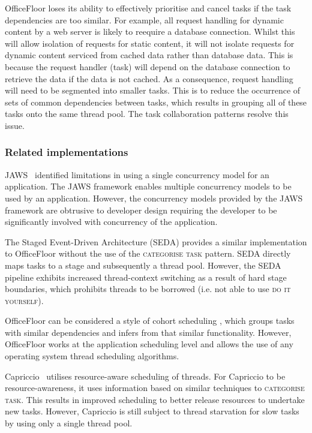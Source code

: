 \documentclass[prodmode]{style/acmlarge}
\begin{document}
OfficeFloor loses its ability to effectively prioritise and cancel tasks if the
task dependencies are too similar.  For example, all request handling for
dynamic content by a web server is likely to reequire a database connection.
Whilst this will allow isolation of requests for static content, it will not
isolate requests for dynamic content serviced from cached data rather than
database data.  This is because the request handler (task) will depend on the
database connection to retrieve the data if the data is not cached.  As a
consequence, request handling will need to be segmented into smaller tasks. 
This is to reduce the occurrence of sets of common dependencies between tasks,
which results in grouping all of these tasks onto the same thread pool.  The task
collaboration patterns resolve this issue.


\subsubsection*{Related implementations}

JAWS~\cite{jaws} identified limitations in using a single concurrency model for
an application.  The JAWS framework enables multiple concurrency models to be
used by an application.  However, the concurrency models provided by the JAWS
framework are obtrusive to developer design requiring the developer to be
significantly involved with concurrency of the application.

The Staged Event-Driven Architecture (SEDA) \cite{seda} provides a similar
implementation to OfficeFloor without the use of the \textsc{categorise task}
pattern.  SEDA directly maps tasks to a stage and subsequently a thread pool.
However, the SEDA pipeline exhibits increased thread-context switching as a
result of hard stage boundaries, which prohibits threads to be borrowed (i.e.
not able to use \textsc{do it yourself}).

OfficeFloor can be considered a style of cohort scheduling \cite{cohort}, which
groups tasks with similar dependencies and infers from that similar
functionality.  However, OfficeFloor works at the application scheduling level
and allows the use of any operating system thread scheduling algorithms.

Capriccio~\cite{capriccio} utilises resource-aware scheduling of threads.  For
Capriccio to be resource-awareness, it uses information based on similar
techniques to \textsc{categorise task}.  This results in improved scheduling to
better release resources to undertake new tasks.  However, Capriccio is still
subject to thread starvation for slow tasks by using only a single thread pool.
\end{document}
